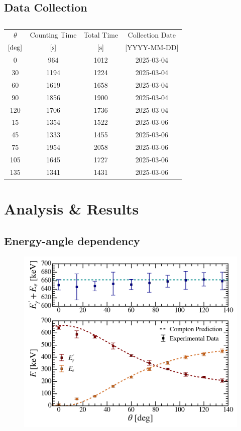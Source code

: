 \documentclass[aps,twocolumn,secnumarabic,balancelastpage,amsmath,amssymb,nofootinbib,floatfix]{revtex4-1}
\begin{document}
\subsection{Data Collection}
\label{ssec:data_collection}

\begin{table}
    \centering
    \addtolength{\tabcolsep}{3pt}
    \def\arraystretch{1.2}
    \begin{tabular}{c c c c}
        \hline
        $\theta$ & Counting Time & Total Time & Collection Date \\ [0ex]
        $[\rm{deg}]$ & $[\rm{s}]$ & $[\rm{s}]$ & [YYYY-MM-DD] \\ [1ex]
        \hline\hline

        0 & 964 & 1012 & 2025-03-04 \\
        30 & 1194 & 1224 & 2025-03-04 \\
        60 & 1619 & 1658 & 2025-03-04 \\
        90 & 1856 & 1900 & 2025-03-04 \\
        120 & 1706 & 1736 & 2025-03-04 \\
        15 & 1354 & 1522 & 2025-03-06 \\
        45 & 1333 & 1455 & 2025-03-06 \\
        75 & 1954 & 2058 & 2025-03-06 \\
        105 & 1645 & 1727 & 2025-03-06 \\
        135 & 1341 & 1431 & 2025-03-06 \\
        
        \hline
        
    \end{tabular}
    \caption{}
    \label{tab:data_collection}    
\end{table}


\section{Analysis \& Results}
\label{sec:result}

\subsection{Energy-angle dependency}
\label{ssec:energy_angle_dependency}

\begin{figure}
    \centering
    \includegraphics[width=0.49 \textwidth]{Figures/energy_angle_dependency.png}
    \caption{}
    \label{fig:energy_angle_dependency}
\end{figure}
\end{document}

